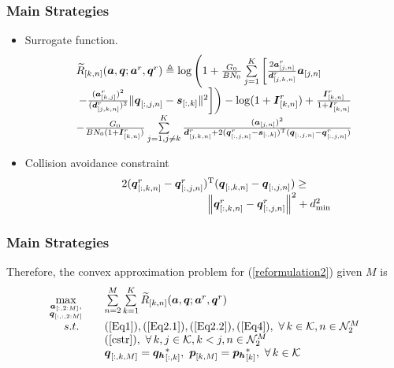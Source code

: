 \documentclass[11.5pt]{beamer}
\begin{document}
\begin{frame}
	\frametitle{Main Strategies}
	\begin{itemize}
		\item<1-> Surrogate function. 
		\begin{equation}\label{surro}
			\begin{array}{ll}
			\widetilde{R}_{[k,n]}(\boldsymbol{a},\boldsymbol{q};\boldsymbol{a}^r,\boldsymbol{q}^r) \triangleq\log\left(1+\frac{G_0}{BN_0}\sum\limits_{j=1}^K\left[\frac{2\boldsymbol{a}^r_{[j,n]}}{\boldsymbol{d}^r_{[j,k,n]}}\boldsymbol{a}_{[j,n]}\right.\right. \\
			\left.\left.-\frac{(\boldsymbol{a}^r_{[k,j]})^2}{(\boldsymbol{d}^r_{[j,k,n]})^2}\lVert\boldsymbol{q}_{[:,j,n]}-\boldsymbol{s}_{[:,k]}\rVert^2\right]\right)-\log(1+\boldsymbol{I}^r_{[k,n]})+\frac{\boldsymbol{I}^r_{[k,n]}}{1+\boldsymbol{I}^r_{[k,n]}} \\
			-\frac{G_0}{BN_0(1+\boldsymbol{I}^r_{[k,n]})}\sum\limits_{j=1,j\ne k}^{K}\frac{(\boldsymbol{a}_{[j,n]})^2}{\boldsymbol{d}^r_{[j,k,n]}+2(\boldsymbol{q}^r_{[:,j,n]}-\boldsymbol{s}_{[:,k]})^{\rm T}(\boldsymbol{q}_{[:,j,n]}-\boldsymbol{q}^r_{[:,j,n]})}
			\end{array}
		\end{equation}
		\item<2-> Collision avoidance constraint
		\begin{equation}\label{cstr}
			\begin{array}{c}
			2(\boldsymbol{q}^r_{[:,k,n]}-\boldsymbol{q}^r_{[:,j,n]})^{\rm T}(\boldsymbol{q}_{[:,k,n]}-\boldsymbol{q}_{[:,j,n]})\geq  \\
			\qquad\qquad\qquad\qquad\qquad\left\lVert\boldsymbol{q}^r_{[:,k,n]}-\boldsymbol{q}^r_{[:,j,n]}\right\rVert^2+d_{\min}^2
			\end{array}
		\end{equation}
	\end{itemize}
\end{frame}


\begin{frame}
\frametitle{Main Strategies}
Therefore, the convex approximation problem for (\ref{reformulation2}) given $M$ is
\begin{equation}\label{cvxapprox}
	\begin{array}{cll}
	\max\limits_{\substack{\boldsymbol{a}_{[:,2:M]},\\ \boldsymbol{q}_{[:,:,2:M]}}}\quad & \sum\limits_{n=2}^{M}\sum\limits_{k=1}^K \widetilde{R}_{[k,n]}(\boldsymbol{a},\boldsymbol{q};\boldsymbol{a}^r,\boldsymbol{q}^r) \\ 
	s.t.  & (\ref{Eq1}),(\ref{Eq2.1}),(\ref{Eq2.2}),(\ref{Eq4}),\ \forall\,k\in\mathcal{K},n\in\mathcal{N}_2^M \\
	& (\ref{cstr}),\ \forall\,k,j\in\mathcal{K},k<j,n\in\mathcal{N}_2^M \\
	& \boldsymbol{q}_{[:,k,M]}=\boldsymbol{q_h}^*_{[:,k]},\   \boldsymbol{p}_{[k,M]} = \boldsymbol{p_h}^*_{[k]},\  \forall\,k\in\mathcal{K}
	\end{array}
\end{equation}

\end{frame}
\end{document}

